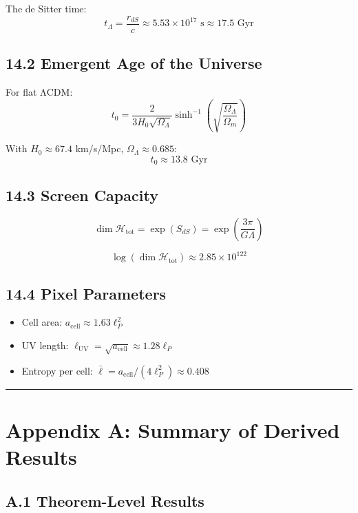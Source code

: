 The de Sitter time: \[t_\Lambda = \frac{r_{dS}}{c} \approx 5.53 \times 10^{17} \text{ s} \approx 17.5 \text{ Gyr}\]

\subsection{14.2 Emergent Age of the Universe}\label{142-emergent-age-of-the-universe}

For flat ΛCDM: \[t_0 = \frac{2}{3H_0\sqrt{\Omega_\Lambda}} \sinh^{-1}\left(\sqrt{\frac{\Omega_\Lambda}{\Omega_m}}\right)\]

With \(H_0 \approx 67.4\) km/s/Mpc, \(\Omega_\Lambda \approx 0.685\): \[t_0 \approx 13.8 \text{ Gyr}\]

\subsection{14.3 Screen Capacity}\label{143-screen-capacity}

\[\dim \mathcal{H}_{\text{tot}} = \exp(S_{dS}) = \exp\left(\frac{3\pi}{G\Lambda}\right)\]

\[\log(\dim \mathcal{H}_{\text{tot}}) \approx 2.85 \times 10^{122}\]

\subsection{14.4 Pixel Parameters}\label{144-pixel-parameters}

\begin{itemize}
\tightlist
\item
  Cell area: \(a_{\text{cell}} \approx 1.63 \ell_P^2\)
\item
  UV length: \(\ell_{\text{UV}} = \sqrt{a_{\text{cell}}} \approx 1.28 \ell_P\)
\item
  Entropy per cell: \(\bar{\ell} = a_{\text{cell}}/(4\ell_P^2) \approx 0.408\)
\end{itemize}

\begin{center}\rule{0.5\linewidth}{0.5pt}\end{center}

\section{Appendix A: Summary of Derived Results}\label{appendix-a-summary-of-derived-results}

\subsection{A.1 Theorem-Level Results}\label{a1-theorem-level-results}

